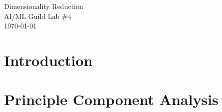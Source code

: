 \documentclass[letterpaper,12pt]{article}
\begin{document}
\begin{flushleft}
Dimensionality Reduction\\
AI/ML Guild Lab \#4\\
\today \\
\end{flushleft}

\section{Introduction}

\section{Principle Component Analysis}
\end{document}

